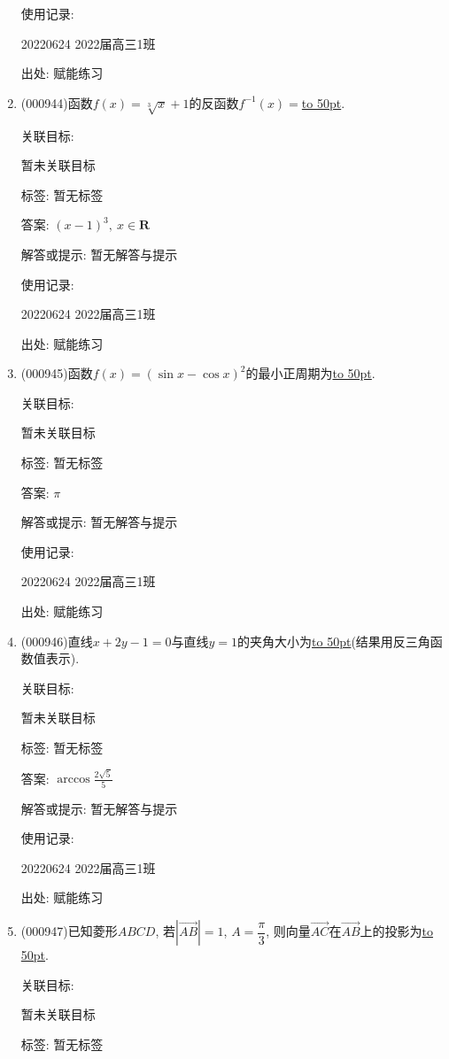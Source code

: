 \documentclass[10pt,a4paper]{article}
\newcommand{\blank}[1]{\underline{\hbox to #1pt{}}}
\begin{document}
\begin{enumerate}[1.]
使用记录:

20220624	2022届高三1班	


出处: 赋能练习
\item { (000944)}函数$f(x)=\sqrt[3]x+1$的反函数$f^{-1}(x)=$\blank{50}.


关联目标:

暂未关联目标



标签: 暂无标签

答案: $(x-1)^3, \ x\in \mathbf{R}$

解答或提示: 暂无解答与提示

使用记录:

20220624	2022届高三1班	


出处: 赋能练习
\item { (000945)}函数$f(x)=(\sin x-\cos x)^2$的最小正周期为\blank{50}.


关联目标:

暂未关联目标



标签: 暂无标签

答案: $\pi$

解答或提示: 暂无解答与提示

使用记录:

20220624	2022届高三1班	


出处: 赋能练习
\item { (000946)}直线$x+2y-1=0$与直线$y=1$的夹角大小为\blank{50}(结果用反三角函数值表示).


关联目标:

暂未关联目标



标签: 暂无标签

答案: $\arccos \frac{2\sqrt 5}5$

解答或提示: 暂无解答与提示

使用记录:

20220624	2022届高三1班	


出处: 赋能练习
\item { (000947)}已知菱形$ABCD$, 若$|\overrightarrow{AB}|=1$, $A=\dfrac\pi 3$, 则向量$\overrightarrow{AC}$在$\overrightarrow{AB}$上的投影为\blank{50}.


关联目标:

暂未关联目标



标签: 暂无标签


\end{enumerate}
\end{document}

